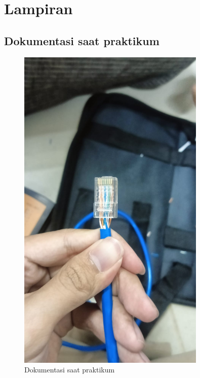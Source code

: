 \section{Lampiran}
\subsection{Dokumentasi saat praktikum}
\begin{figure}
    \centering
    \includegraphics[width=0.8\textwidth]{P1/img/jk1 (1).jpg}
    \caption{Dokumentasi saat praktikum}
    \label{fig:dokumentasi_praktikum}
\end{figure}
